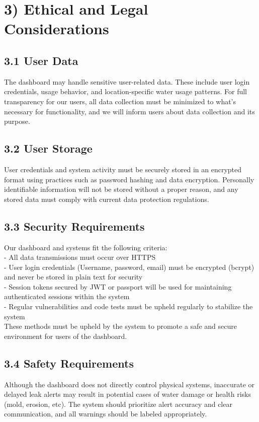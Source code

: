\documentclass[10pt]{article}
\begin{document}
\section*{3) Ethical and Legal Considerations}

\subsection*{3.1 User Data}
The dashboard may handle sensitive user-related data. These include user login credentials, usage behavior, and location-specific water usage patterns. For full transparency for our users, all data collection must be minimized to what's necessary for functionality, and we will inform users about data collection and its purpose.

\subsection*{3.2 User Storage}
User credentials and system activity must be securely stored in an encrypted format using practices such as password hashing and data encryption. Personally identifiable information will not be stored without a proper reason, and any stored data must comply with current data protection regulations.

\subsection*{3.3 Security Requirements}
Our dashboard and systems fit the following criteria:\\
- All data transmissions must occur over HTTPS\\
- User login credentials (Username, password, email) must be encrypted (bcrypt) and never be stored in plain text for security\\
- Session tokens secured by JWT or passport will be used for maintaining authenticated sessions within the system\\
- Regular vulnerabilities and code tests must be upheld regularly to stabilize the system\\
These methods must be upheld by the system to promote a safe and secure environment for users of the dashboard.

\subsection*{3.4 Safety Requirements}
Although the dashboard does not directly control physical systems, inaccurate or delayed leak alerts may result in potential cases of water damage or health risks (mold, erosion, etc). The system should prioritize alert accuracy and clear communication, and all warnings should be labeled appropriately.
\end{document}
